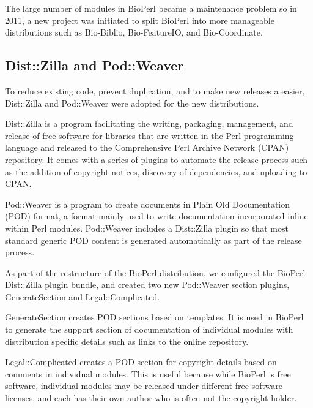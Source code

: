 The large number of modules in BioPerl became a maintenance problem
so in 2011, a new project was initiated to split BioPerl into
more manageable distributions such as Bio-Biblio, Bio-FeatureIO, and
Bio-Coordinate.

\subsection{Dist::Zilla and Pod::Weaver}

To reduce existing code, prevent duplication,
and to make new releases
a easier, Dist::Zilla and Pod::Weaver were adopted for
the new distributions.

Dist::Zilla is a program facilitating the writing, packaging, management,
and release of free software for libraries that are written in the Perl
programming language and released to the Comprehensive Perl Archive
Network (CPAN) repository.  It comes with a series of plugins to automate the
release process such as the addition of copyright notices, discovery
of dependencies, and uploading to CPAN.

Pod::Weaver is a program to create documents in Plain Old
Documentation (POD) format, a format mainly used to write
documentation incorporated inline within Perl modules.
Pod::Weaver includes a Dist::Zilla plugin
so that most standard generic POD content is
generated automatically as part of the release process.

As part of the restructure of the BioPerl distribution, we configured
the BioPerl Dist::Zilla plugin bundle, and created two new Pod::Weaver
section plugins, GenerateSection and Legal::Complicated.

GenerateSection creates POD sections based on templates.  It is
used in BioPerl to generate the support section of documentation
of individual modules
with distribution specific details such as links to the online
repository.

Legal::Complicated creates a POD section for copyright details
based on comments in individual modules.  This is useful because while
BioPerl is free
software, individual modules may be released under different free
software licenses, and each has their own author who is often not
the copyright holder.


